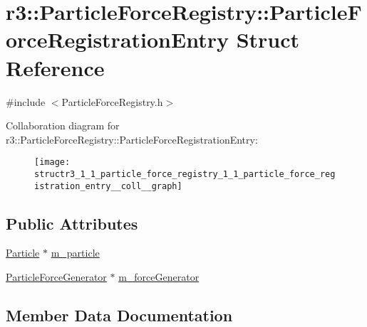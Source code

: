 \hypertarget{structr3_1_1_particle_force_registry_1_1_particle_force_registration_entry}{}\section{r3\+:\+:Particle\+Force\+Registry\+:\+:Particle\+Force\+Registration\+Entry Struct Reference}
\label{structr3_1_1_particle_force_registry_1_1_particle_force_registration_entry}


{\ttfamily \#include $<$Particle\+Force\+Registry.\+h$>$}



Collaboration diagram for r3\+:\+:Particle\+Force\+Registry\+:\+:Particle\+Force\+Registration\+Entry\+:\nopagebreak
\begin{figure}[H]
\begin{center}
\leavevmode
\texttt{[image: structr3\_1\_1\_particle\_force\_registry\_1\_1\_particle\_force\_registration\_entry\_\_coll\_\_graph]}
\end{center}
\end{figure}
\subsection*{Public Attributes}
\begin{DoxyCompactItemize}
\item 
\mbox{\hyperlink{classr3_1_1_particle}{Particle}} $\ast$ \mbox{\hyperlink{structr3_1_1_particle_force_registry_1_1_particle_force_registration_entry_aeecc96403147078a56bc1d4f9425463d}{m\+\_\+particle}}
\item 
\mbox{\hyperlink{classr3_1_1_particle_force_generator}{Particle\+Force\+Generator}} $\ast$ \mbox{\hyperlink{structr3_1_1_particle_force_registry_1_1_particle_force_registration_entry_ae3930ad7fedc39be90fab7ef27ae5d46}{m\+\_\+force\+Generator}}
\end{DoxyCompactItemize}


\subsection{Member Data Documentation}
\mbox{\label{structr3_1_1_particle_force_registry_1_1_particle_force_registration_entry_ae3930ad7fedc39be90fab7ef27ae5d46}} 
